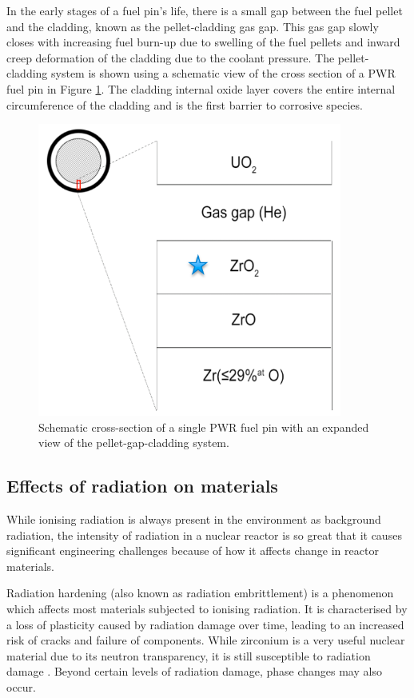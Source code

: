 In the early stages of a fuel pin's life, there is a small gap between the fuel pellet and the cladding, known as the pellet-cladding gas gap. This gas gap slowly closes with increasing fuel burn-up due to swelling of the fuel pellets and inward creep deformation of the cladding due to the coolant pressure. The pellet-cladding system is shown using a schematic view of the cross section of a PWR fuel pin in Figure \ref{figure:gas_gap}. The cladding internal oxide layer covers the entire internal circumference of the cladding and is the first barrier to corrosive species. 

\begin{figure}[ht]
\centering
\includegraphics[width=10cm]{images/gas_gap.png}
\caption{Schematic cross-section of a single PWR fuel pin with an expanded view of the pellet-gap-cladding system.}
\label{figure:gas_gap}
\end{figure}

\subsection{Effects of radiation on materials} 

While ionising radiation is always present in the environment as background radiation, the intensity of radiation in a nuclear reactor is so great that it causes significant engineering challenges because of how it affects change in reactor materials.

Radiation hardening (also known as radiation embrittlement) is a phenomenon which affects most materials subjected to ionising radiation. It is characterised by a loss of plasticity caused by radiation damage over time, leading to an increased risk of cracks and failure of components. While zirconium is a very useful nuclear material due to its neutron transparency, it is still susceptible to radiation damage \cite{Wisner1998}. Beyond certain levels of radiation damage, phase changes may also occur. %

